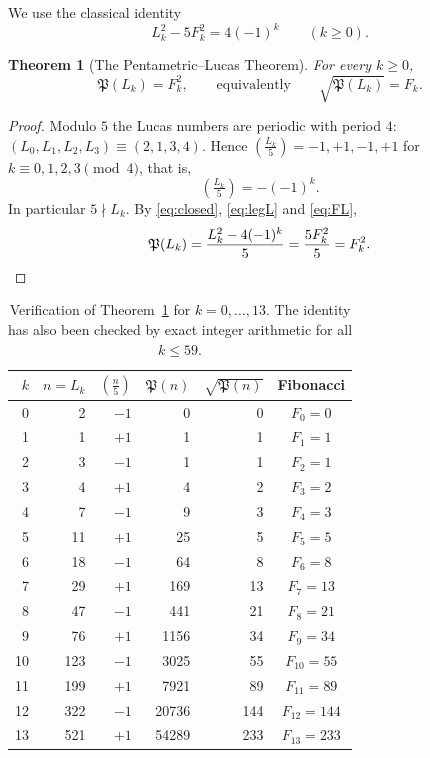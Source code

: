 \documentclass[11pt,a4paper]{article}
\newcommand{\Pent}{\mathfrak{P}}                      %
\newcommand{\leg}[1]{\left(\tfrac{#1}{5}\right)}      %
\theoremstyle{plain}
\newtheorem{theorem}{Theorem}[section]
\theoremstyle{definition}
\theoremstyle{remark}
\begin{document}
We use the classical identity \cite{Koshy2001}
\begin{equation}\label{eq:FL}
  L_k^{2}-5F_k^{2}=4(-1)^{k}\qquad(k\ge0).
\end{equation}

\begin{theorem}[The Pentametric–Lucas Theorem]\label{thm:PL}
For every $k\ge0$,
\[
  \Pent(L_k)=F_k^{2},\qquad\text{equivalently}\qquad \sqrt{\Pent(L_k)}=F_k .
\]
\end{theorem}

\begin{proof}
Modulo $5$ the Lucas numbers are periodic with period $4$: $(L_0,L_1,L_2,L_3)\equiv(2,1,3,4)$. Hence $\leg{L_k}=-1,+1,-1,+1$ for $k\equiv0,1,2,3\pmod4$, that is,
\begin{equation}\label{eq:legL}
  \leg{L_k}=-(-1)^{k}.
\end{equation}
In particular $5\nmid L_k$. By \eqref{eq:closed}, \eqref{eq:legL} and \eqref{eq:FL},
\[
  \Pent(L_k)=\frac{L_k^{2}-4(-1)^{k}}{5}=\frac{5F_k^{2}}{5}=F_k^{2}.\qedhere
\]
\end{proof}

\begin{table}[ht]
\centering\small
\caption{Verification of Theorem~\ref{thm:PL} for $k=0,\dots,13$. The identity has also been checked by exact integer arithmetic for all $k\le 59$.}\label{tab:PL}
\begin{tabular}{@{}rrrrrc@{}}
\toprule
$k$ & $n=L_k$ & $\leg{n}$ & $\Pent(n)$ & $\sqrt{\Pent(n)}$ & Fibonacci \\
\midrule
0 & 2 & $-1$ & 0 & 0 & $F_0=0$ \\
1 & 1 & $+1$ & 1 & 1 & $F_1=1$ \\
2 & 3 & $-1$ & 1 & 1 & $F_2=1$ \\
3 & 4 & $+1$ & 4 & 2 & $F_3=2$ \\
4 & 7 & $-1$ & 9 & 3 & $F_4=3$ \\
5 & 11 & $+1$ & 25 & 5 & $F_5=5$ \\
6 & 18 & $-1$ & 64 & 8 & $F_6=8$ \\
7 & 29 & $+1$ & 169 & 13 & $F_7=13$ \\
8 & 47 & $-1$ & 441 & 21 & $F_8=21$ \\
9 & 76 & $+1$ & 1156 & 34 & $F_9=34$ \\
10 & 123 & $-1$ & 3025 & 55 & $F_{10}=55$ \\
11 & 199 & $+1$ & 7921 & 89 & $F_{11}=89$ \\
12 & 322 & $-1$ & 20736 & 144 & $F_{12}=144$ \\
13 & 521 & $+1$ & 54289 & 233 & $F_{13}=233$ \\
\bottomrule
\end{tabular}
\end{table}
\end{document}
